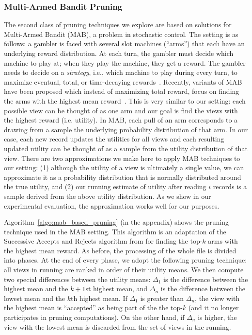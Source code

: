 \subsubsection{Multi-Armed Bandit Pruning}
\label{sec:multi_armed_bandit}
The second class of pruning techniques we explore
are based on solutions for Multi-Armed Bandit (MAB), a problem 
in stochastic control. 
The setting is as follows: 
a gambler is faced with several slot
machines (``arms'') that each have an underlying reward
distribution. 
At each turn, the gambler must decide which machine
to play at; when they play the machine, they get a reward.
The gambler needs to decide on a {\em strategy}, i.e.,
which machine to play during every turn, to maximize
eventual, total, or time-decaying rewards~\cite{bandits}.
Recently, variants of MAB have been proposed 
which instead of maximizing total reward, 
focus on finding the arms with the highest mean reward~\cite{BubeckWV13}.
This is very similar to our setting: each possible view can be thought of as
one arm and our goal is find the views with the highest reward (i.e.
utility).
In MAB, each pull of an arm corresponds to a drawing from a sample
the underlying probability distribution of that arm.
In our case, each new record updates the utilities for all views and
each resulting updated utility can be thought of as a sample from the
utility distribution of that view.
There are two approximations we make here to apply MAB techniques
to our setting: 
(1) although the utility of a
view is ultimately a single value, we can approximate it as a probability
distribution that is normally distributed around the true utility, and 
(2) our running estimate of utility after reading $i$
records is a sample derived from the above utility distribution.
As we show in our experimental evaluation, the approximation works well
for our purposes.

Algorithm~\ref{algo:mab_based_pruning} (in the appendix) shows the pruning technique used in the
MAB setting.
This algorithm is an adaptation of the Successive Accepts and Rejects
algorithm from \cite{BubeckWV13} for finding the top-$k$ arms with the highest
mean reward.
As before, the processing of the whole file is divided into phases.
At the end of every phase, we adopt the following pruning technique: all views
in running are ranked in order of their utility means. 
We then compute two special differences between the utility means: $\Delta_1$
is the difference between the highest mean and the $k+1$st highest mean, and
$\Delta_n$ is the difference between the lowest mean and the $k$th highest mean.
If $\Delta_1$ is greater than $\Delta_n$, the view with the highest mean is
``accepted'' as being part of the the top-$k$ (and it no longer participates
in pruning computations).
On the other hand, if $\Delta_n$ is higher, the view with the lowest mean is discarded
from the set of views in the running.




